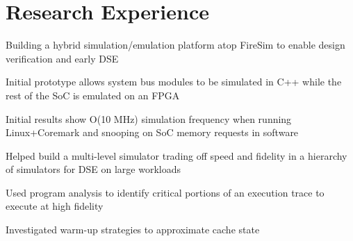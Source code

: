 \documentclass[]{deedy-resume-openfont}
\begin{document}
\begin{minipage}[t]{0.64\textwidth} 


\section{Research Experience}



\vspace{\topsep}
{\normalsize
\begin{tightemize}
\item Building a hybrid simulation/emulation platform atop FireSim to enable design verification and early DSE 
\item Initial prototype allows system bus modules to be simulated in C++ while the rest of the SoC is emulated on an FPGA
\item Initial results show O(10 MHz) simulation frequency when running Linux+Coremark and snooping on SoC memory requests in software 
\end{tightemize}
}

{\normalsize
\begin{tightemize}
\item Helped build a multi-level simulator trading off speed and fidelity in a hierarchy of simulators for DSE on large workloads
\item Used program analysis to identify critical portions of an execution trace to execute at high fidelity
\item Investigated warm-up strategies to approximate cache state 
\end{tightemize}
}


\end{minipage}
\end{document}
